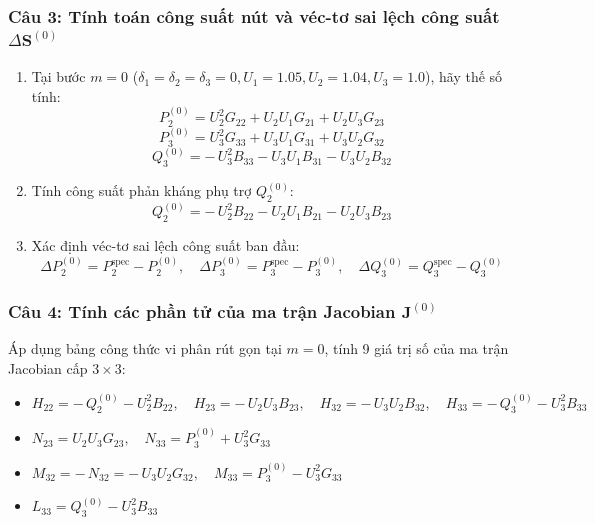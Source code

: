 \documentclass[10.5pt,a4paper]{article}
\begin{document}
\subsubsection*{Câu 3: Tính toán công suất nút và véc-tơ sai lệch công suất $\Delta \mathbf{S}^{(0)}$}
\begin{enumerate}\setlength{\itemsep}{2pt}\setlength{\parskip}{0pt}
    \item[3.1] Tại bước $m=0$ ($\delta_1 = \delta_2 = \delta_3 = 0, U_1 = 1.05, U_2 = 1.04, U_3 = 1.0$), hãy thế số tính:
    $$P_2^{(0)} = U_2^2 G_{22} + U_2 U_1 G_{21} + U_2 U_3 G_{23}$$
    $$P_3^{(0)} = U_3^2 G_{33} + U_3 U_1 G_{31} + U_3 U_2 G_{32}$$
    $$Q_3^{(0)} = -\, U_3^2 B_{33} - U_3 U_1 B_{31} - U_3 U_2 B_{32}$$
    \item[3.2] Tính công suất phản kháng phụ trợ $Q_2^{(0)}$:
    $$Q_2^{(0)} = -\, U_2^2 B_{22} - U_2 U_1 B_{21} - U_2 U_3 B_{23}$$
    \item[3.3] Xác định véc-tơ sai lệch công suất ban đầu:
    $$\Delta P_2^{(0)} = P_2^{\text{spec}} - P_2^{(0)}, \quad \Delta P_3^{(0)} = P_3^{\text{spec}} - P_3^{(0)}, \quad \Delta Q_3^{(0)} = Q_3^{\text{spec}} - Q_3^{(0)}$$
\end{enumerate}

\subsubsection*{Câu 4: Tính các phần tử của ma trận Jacobian $\mathbf{J}^{(0)}$}
Áp dụng bảng công thức vi phân rút gọn tại $m=0$, tính 9 giá trị số của ma trận Jacobian cấp $3 \times 3$:
\begin{itemize}\setlength{\itemsep}{1pt}\setlength{\parskip}{0pt}
    \item $H_{22} = -\, Q_2^{(0)} - U_2^2 B_{22}, \quad H_{23} = -\, U_2 U_3 B_{23}, \quad H_{32} = -\, U_3 U_2 B_{32}, \quad H_{33} = -\, Q_3^{(0)} - U_3^2 B_{33}$
    \item $N_{23} = U_2 U_3 G_{23}, \quad N_{33} = P_3^{(0)} + U_3^2 G_{33}$
    \item $M_{32} = -\, N_{32} = -\, U_3 U_2 G_{32}, \quad M_{33} = P_3^{(0)} - U_3^2 G_{33}$
    \item $L_{33} = Q_3^{(0)} - U_3^2 B_{33}$
\end{itemize}
\end{document}

